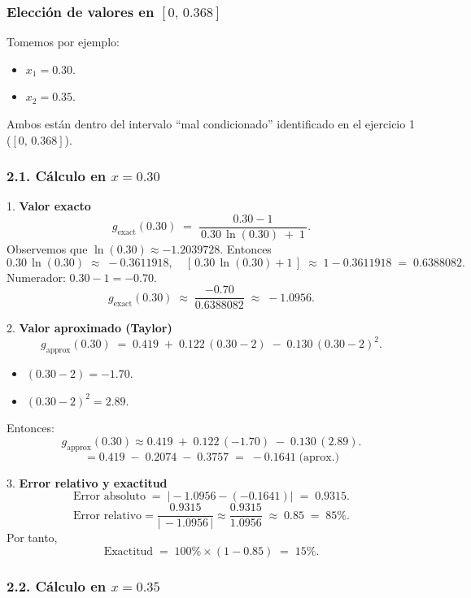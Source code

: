 \subsubsection{Elección de valores en \([0,\,0.368]\)}

Tomemos por ejemplo:
\begin{itemize}
    \item \(x_1 = 0.30\).  
    \item \(x_2 = 0.35\).
\end{itemize} 

Ambos están dentro del intervalo “mal condicionado” identificado en el ejercicio 1 (\([0,\,0.368]\)).

\subsubsection{2.1. Cálculo en \(x=0.30\)}

1. \textbf{Valor exacto} 
   \[
   g_{\text{exact}}(0.30) 
   \;=\; \frac{0.30 - 1}{\,0.30\,\ln(0.30)\;+\;1\,}.
   \]  
   Observemos que \(\ln(0.30)\approx -1.2039728\). Entonces  
   \[
   0.30 \,\ln(0.30)\;\approx\;-0.3611918,
   \quad
   [\,0.30\,\ln(0.30)+1\,]\;\approx\;1 - 0.3611918\;=\;0.6388082.
   \]  
   Numerador: \(0.30 - 1 = -0.70\).  
   \[
   g_{\text{exact}}(0.30)
   \;\approx\;\frac{-0.70}{0.6388082}
   \;\approx\;-1.0956.
   \]

2. \textbf{Valor aproximado (Taylor)}  
   \[
   g_{\text{approx}}(0.30)
   \;=\;0.419 \;+\;0.122\,(0.30-2)\;-\;0.130\,(0.30-2)^{2}.
   \]
   \begin{itemize}
         \item \( (0.30 - 2) = -1.70\).  
         \item \( (0.30 - 2)^2 = 2.89\).
         
    \end{itemize}
   Entonces:  
   \[
   g_{\text{approx}}(0.30)
   \approx 0.419 
         \;+\;0.122\,(-1.70)
         \;-\;0.130\,(2.89).
   \]
   \[
   = 0.419 
     \;-\;0.2074
     \;-\;0.3757
   \;=\;-0.1641 \;\text{(aprox.)}
   \]

3. \textbf{Error relativo y exactitud} 
   \[
   \text{Error absoluto} 
   \;=\;\bigl|-1.0956 - (-0.1641)\bigr|
   \;=\;0.9315.
   \]
   \[
   \text{Error relativo} 
   = \frac{0.9315}{|\,-1.0956\,|}
   \approx \frac{0.9315}{1.0956}
   \;\approx\;0.85 \;=\;85\%.
   \]
   Por tanto,  
   \[
   \text{Exactitud}
   \;=\;100\%\times(1 - 0.85)
   \;=\;15\%.
   \]

\subsubsection{2.2. Cálculo en \(x=0.35\)}

